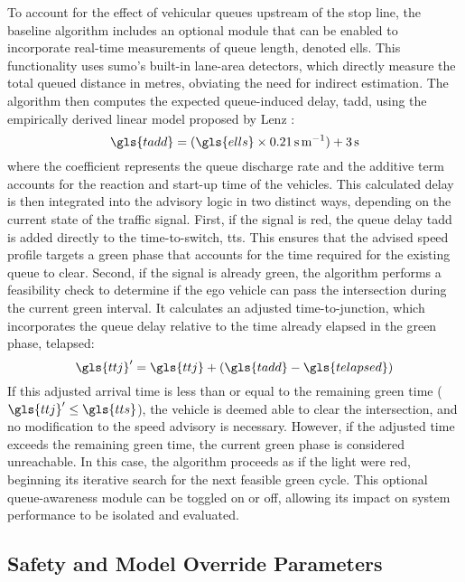 To account for the effect of vehicular queues upstream of the stop line, the baseline algorithm includes an optional module that can be enabled to incorporate real-time measurements of queue length, denoted \gls{ells}. This functionality uses \ac{sumo}'s built-in lane-area detectors, which directly measure the total queued distance in metres, obviating the need for indirect estimation. The algorithm then computes the expected queue-induced delay, \gls{tadd}, using the empirically derived linear model proposed by Lenz \cite{Lenz2024}:
\begin{equation}
    \gls{tadd} = (\gls{ells} \times 0.21\,\unit{\second\per\metre}) + 3\,\unit{\second}
\end{equation}
where the coefficient represents the queue discharge rate and the additive term accounts for the reaction and start-up time of the vehicles. This calculated delay is then integrated into the advisory logic in two distinct ways, depending on the current state of the traffic signal.
\mynewline
First, if the signal is red, the queue delay \gls{tadd} is added directly to the time-to-switch, \gls{tts}. This ensures that the advised speed profile targets a green phase that accounts for the time required for the existing queue to clear.
\mynewline
Second, if the signal is already green, the algorithm performs a feasibility check to determine if the ego vehicle can pass the intersection during the current green interval. It calculates an adjusted time-to-junction, which incorporates the queue delay relative to the time already elapsed in the green phase, \gls{telapsed}:
\begin{equation}
    \gls{ttj}' = \gls{ttj} + (\gls{tadd} - \gls{telapsed})
\end{equation}
If this adjusted arrival time is less than or equal to the remaining green time ($\gls{ttj}' \le \gls{tts}$), the vehicle is deemed able to clear the intersection, and no modification to the speed advisory is necessary. However, if the adjusted time exceeds the remaining green time, the current green phase is considered unreachable. In this case, the algorithm proceeds as if the light were red, beginning its iterative search for the next feasible green cycle. This optional queue-awareness module can be toggled on or off, allowing its impact on system performance to be isolated and evaluated.

\subsection{Safety and Model Override Parameters}
\label{sec:Glosa_Safety_Overrides}

